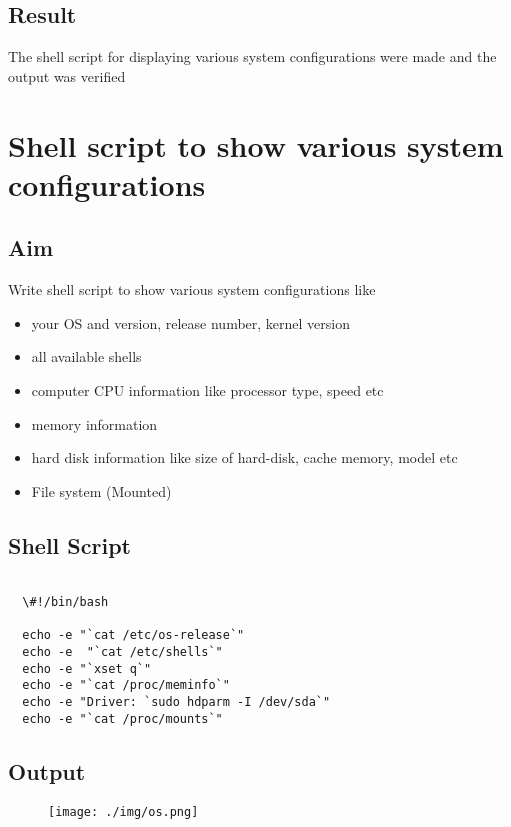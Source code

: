 \documentclass{article}
\begin{document}
\subsection{Result}
The shell script for displaying various system configurations were made and the output was verified
\begin{refsection}
\cite{shellbible}
\cite{shellbook}
\printbibliography
\end{refsection}

\newpage

\newpage

\section{Shell script to show various system configurations}

\subsection {Aim}

Write shell script to show various system configurations like
\begin{itemize}
\item your OS and version, release number, kernel version
\item all available shells
\item computer CPU information like processor type, speed etc
\item memory information
\item hard disk information like size of hard-disk, cache memory, model etc
\item File system (Mounted)
\end{itemize}

\subsection{Shell Script}

\begin{verbatim}

  \#!/bin/bash
   
  echo -e "`cat /etc/os-release`"
  echo -e  "`cat /etc/shells`"
  echo -e "`xset q`"
  echo -e "`cat /proc/meminfo`"
  echo -e "Driver: `sudo hdparm -I /dev/sda`"
  echo -e "`cat /proc/mounts`"

\end{verbatim}
\subsection{Output}
\begin{figure}[h!]
	\texttt{[image: ./img/os.png]}
\end{figure}
\end{document}
